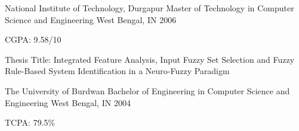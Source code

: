 

\begin{cventries}

  \cventry
    {National Institute of Technology, Durgapur} %
    {Master of Technology in Computer Science and Engineering} %
    {West Bengal, IN} %
    {2006} %
    {
      \begin{cvitems} %
        \item {CGPA: 9.58/10} %
        \item {Thesis Title: Integrated Feature Analysis, Input Fuzzy Set Selection and Fuzzy Rule-Based System Identification in a Neuro-Fuzzy Paradigm} %
      \end{cvitems}
    }

  \cventry
    {The University of Burdwan} %
    {Bachelor of Engineering in Computer Science and Engineering} %
    {West Bengal, IN} %
    {2004} %
    {
      \begin{cvitems} %
        \item {TCPA: 79.5\%} %
      \end{cvitems}
    }
  \begin{comment}
  \cventry
    {Higher Secondary, West Bengal Council of Higher Secondary Education} %
    {Burnpur Boys' High School} %
    {West Bengal, India} %
    {2000} %
    {
      \begin{cvitems} %
        \item {Science Major, 79.4\%} %
      \end{cvitems}
    }

  \cventry
    {Secondary, West Bengal Board of Secondary Education} %
    {Asansol Ramakrishna Mission High School} %
    {West Bengal, India} %
    {1998} %
    {
      \begin{cvitems} %
        \item {82\%} %
      \end{cvitems}
    }
  \end{comment}

\end{cventries}
